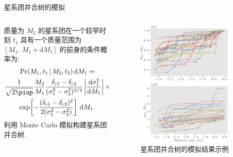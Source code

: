 \documentclass{beamer}
\newcommand{\R}[1]{\text{#1}}  %
\newcommand{\Cpi}{\piup}  %
\newcommand{\D}[1]{\R{d}#1}
\newcommand{\diff}[2]{\frac{\D{#1}}{\D{#2}}}
\begin{document}
\begin{frame}{星系团并合树的模拟}
  \begin{columns}
    质量为 $M_2$ 的星系团在一个较早时刻 $t_1$ 具有一个质量范围为
    $[M_1,\, M_1+\D{M_1}]$ 的前身的条件概率为:
    \begin{multline}
      \R{Pr}(M_1, t_1 \,|\, M_2, t_2) \,\D{M_1} = \\
        \frac{1}{\sqrt{2\Cpi}} \frac{M_2}{M_1}
        \frac{\delta_{c1} - \delta_{c2}}{(\sigma_1^2 - \sigma_2^2)^{3/2}}
        \left| \diff{\sigma_1^2}{M_1} \right|
        \times \\
        \exp \!\left[ -\frac{(\delta_{c1} - \delta_{c2})^2}
        {2(\sigma_1^2 - \sigma_2^2)} \right] \,\D{M_1} .
    \end{multline}
    利用 Monte Carlo 模拟构建星系团\alert{并合树}.

    \begin{figure}
      \centering
      \includegraphics[width=\columnwidth]{merging-history}
      \caption{星系团并合树的模拟结果示例}
    \end{figure}
  \end{columns}
\end{frame}
\end{document}
